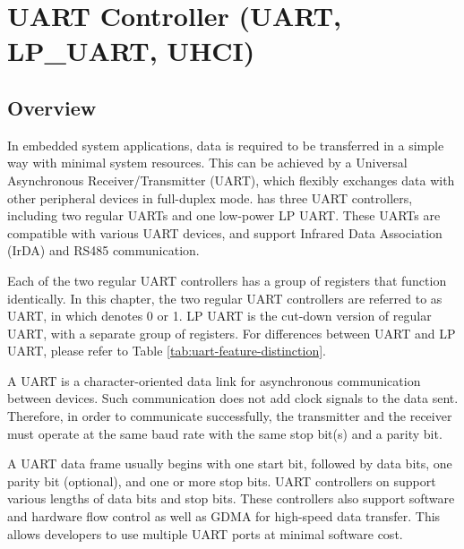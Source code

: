 \documentclass[main\_\_EN.tex]{subfiles}
\begin{document}

\ifglobal
\else
    {\let\clearpage\relax \listoftodos}
    {\let\clearpage\relax \listofdonetodos}
    \tableofcontents
\fi



\hypertarget{uart}{}
\chapter{UART Controller (UART, LP\_UART, UHCI)}
\label{mod:uart}

\section{Overview}

In embedded system applications, data is required to be transferred in a simple way with minimal system resources. This can be achieved by a Universal Asynchronous Receiver/Transmitter (UART), which flexibly exchanges data with other peripheral devices in full-duplex mode. \chipname{} has three UART controllers, including two regular UARTs and one low-power LP UART. These UARTs are compatible with various UART devices, and support Infrared Data Association (IrDA) and RS485 communication.


Each of the two regular UART controllers has a group of registers that function identically. In this chapter, the two regular UART controllers are referred to as UART, in which  denotes 0 or 1. LP UART is the cut-down version of regular UART, with a separate group of registers. For differences between UART and LP UART, please refer to Table \ref{tab:uart-feature-distinction}.


A UART is a character-oriented data link for asynchronous communication between devices. Such communication does not add clock signals to the data sent. Therefore, in order to communicate successfully, the transmitter and the receiver must operate at the same baud rate with the same stop bit(s) and a parity bit.

A UART data frame usually begins with one start bit, followed by data bits, one parity bit (optional), and one or more stop bits. UART controllers on \chipname{} support various lengths of data bits and stop bits. These controllers also support software and hardware flow control as well as GDMA for high-speed data transfer. This allows developers to use multiple UART ports at minimal software cost.
\end{document}
